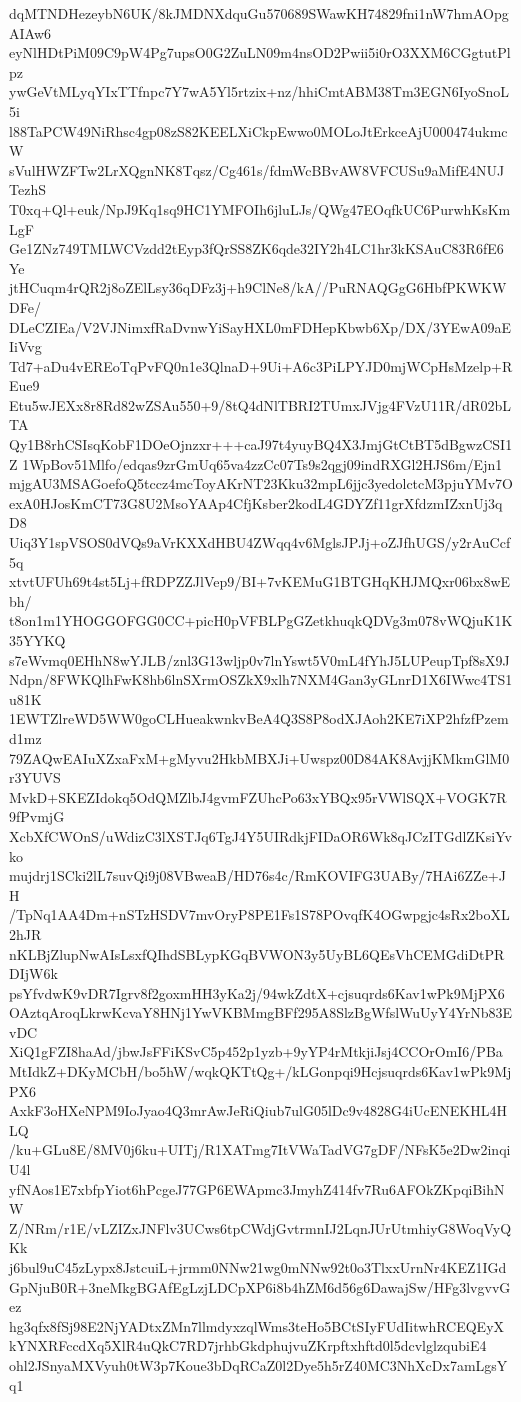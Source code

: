 dqMTNDHezeybN6UK/8kJMDNXdquGu570689SWawKH74829fni1nW7hmAOpgAIAw6
eyNlHDtPiM09C9pW4Pg7upsO0G2ZuLN09m4nsOD2Pwii5i0rO3XXM6CGgtutPlpz
ywGeVtMLyqYIxTTfnpc7Y7wA5Yl5rtzix+nz/hhiCmtABM38Tm3EGN6IyoSnoL5i
l88TaPCW49NiRhsc4gp08zS82KEELXiCkpEwwo0MOLoJtErkceAjU000474ukmcW
sVulHWZFTw2LrXQgnNK8Tqsz/Cg461s/fdmWcBBvAW8VFCUSu9aMifE4NUJTezhS
T0xq+Ql+euk/NpJ9Kq1sq9HC1YMFOIh6jluLJs/QWg47EOqfkUC6PurwhKsKmLgF
Ge1ZNz749TMLWCVzdd2tEyp3fQrSS8ZK6qde32IY2h4LC1hr3kKSAuC83R6fE6Ye
jtHCuqm4rQR2j8oZElLsy36qDFz3j+h9ClNe8/kA//PuRNAQGgG6HbfPKWKWDFe/
DLeCZIEa/V2VJNimxfRaDvnwYiSayHXL0mFDHepKbwb6Xp/DX/3YEwA09aEIiVvg
Td7+aDu4vEREoTqPvFQ0n1e3QlnaD+9Ui+A6c3PiLPYJD0mjWCpHsMzelp+REue9
Etu5wJEXx8r8Rd82wZSAu550+9/8tQ4dNlTBRI2TUmxJVjg4FVzU11R/dR02bLTA
Qy1B8rhCSIsqKobF1DOeOjnzxr+++caJ97t4yuyBQ4X3JmjGtCtBT5dBgwzCSI1Z
1WpBov51Mlfo/edqas9zrGmUq65va4zzCc07Ts9s2qgj09indRXGl2HJS6m/Ejn1
mjgAU3MSAGoefoQ5tccz4mcToyAKrNT23Kku32mpL6jjc3yedolctcM3pjuYMv7O
exA0HJosKmCT73G8U2MsoYAAp4CfjKsber2kodL4GDYZf11grXfdzmIZxnUj3qD8
Uiq3Y1spVSOS0dVQs9aVrKXXdHBU4ZWqq4v6MglsJPJj+oZJfhUGS/y2rAuCcf5q
xtvtUFUh69t4st5Lj+fRDPZZJlVep9/BI+7vKEMuG1BTGHqKHJMQxr06bx8wEbh/
t8on1m1YHOGGOFGG0CC+picH0pVFBLPgGZetkhuqkQDVg3m078vWQjuK1K35YYKQ
s7eWvmq0EHhN8wYJLB/znl3G13wljp0v7lnYswt5V0mL4fYhJ5LUPeupTpf8sX9J
Ndpn/8FWKQlhFwK8hb6lnSXrmOSZkX9xlh7NXM4Gan3yGLnrD1X6IWwc4TS1u81K
1EWTZlreWD5WW0goCLHueakwnkvBeA4Q3S8P8odXJAoh2KE7iXP2hfzfPzemd1mz
79ZAQwEAIuXZxaFxM+gMyvu2HkbMBXJi+Uwspz00D84AK8AvjjKMkmGlM0r3YUVS
MvkD+SKEZIdokq5OdQMZlbJ4gvmFZUhcPo63xYBQx95rVWlSQX+VOGK7R9fPvmjG
XcbXfCWOnS/uWdizC3lXSTJq6TgJ4Y5UIRdkjFIDaOR6Wk8qJCzITGdlZKsiYvko
mujdrj1SCki2lL7suvQi9j08VBweaB/HD76s4c/RmKOVIFG3UABy/7HAi6ZZe+JH
/TpNq1AA4Dm+nSTzHSDV7mvOryP8PE1Fs1S78POvqfK4OGwpgjc4sRx2boXL2hJR
nKLBjZlupNwAIsLsxfQIhdSBLypKGqBVWON3y5UyBL6QEsVhCEMGdiDtPRDIjW6k
psYfvdwK9vDR7Igrv8f2goxmHH3yKa2j/94wkZdtX+cjsuqrds6Kav1wPk9MjPX6
OAztqAroqLkrwKcvaY8HNj1YwVKBMmgBFf295A8SlzBgWfslWuUyY4YrNb83EvDC
XiQ1gFZI8haAd/jbwJsFFiKSvC5p452p1yzb+9yYP4rMtkjiJsj4CCOrOmI6/PBa
MtIdkZ+DKyMCbH/bo5hW/wqkQKTtQg+/kLGonpqi9Hcjsuqrds6Kav1wPk9MjPX6
AxkF3oHXeNPM9IoJyao4Q3mrAwJeRiQiub7ulG05lDc9v4828G4iUcENEKHL4HLQ
/ku+GLu8E/8MV0j6ku+UITj/R1XATmg7ItVWaTadVG7gDF/NFsK5e2Dw2inqiU4l
yfNAos1E7xbfpYiot6hPcgeJ77GP6EWApmc3JmyhZ414fv7Ru6AFOkZKpqiBihNW
Z/NRm/r1E/vLZIZxJNFlv3UCws6tpCWdjGvtrmnIJ2LqnJUrUtmhiyG8WoqVyQKk
j6bul9uC45zLypx8JstcuiL+jrmm0NNw21wg0mNNw92t0o3TlxxUrnNr4KEZ1IGd
GpNjuB0R+3neMkgBGAfEgLzjLDCpXP6i8b4hZM6d56g6DawajSw/HFg3lvgvvGez
hg3qfx8fSj98E2NjYADtxZMn7llmdyxzqlWms3teHo5BCtSIyFUdIitwhRCEQEyX
kYNXRFccdXq5XlR4uQkC7RD7jrhbGkdphujvuZKrpftxhftd0l5dcvlglzqubiE4
ohl2JSnyaMXVyuh0tW3p7Koue3bDqRCaZ0l2Dye5h5rZ40MC3NhXcDx7amLgsYq1
